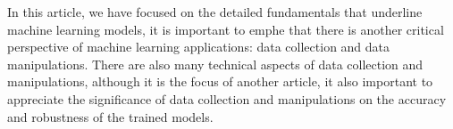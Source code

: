 
\par
In this article, we have focused on the detailed fundamentals that underline machine learning models, it is important to emphe that there is another critical perspective of machine learning applications: data collection and data manipulations. There are also many technical aspects of data collection and manipulations, although it is the focus of another article, it also important to appreciate the significance of data collection and manipulations on the accuracy and robustness of the trained models.
\par 
